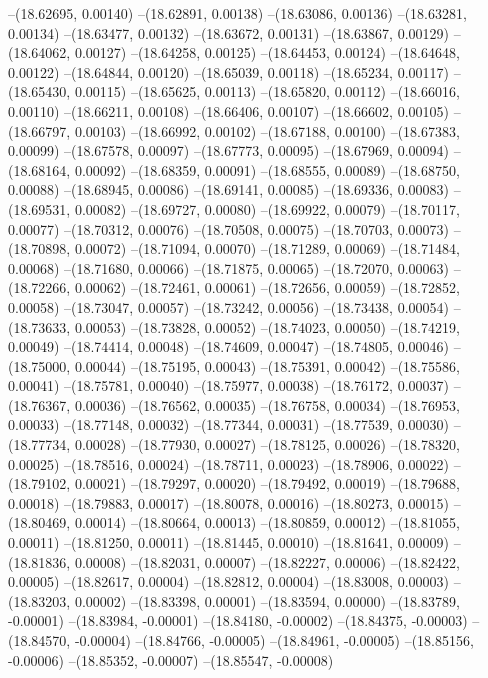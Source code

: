 --(18.62695, 0.00140)
--(18.62891, 0.00138)
--(18.63086, 0.00136)
--(18.63281, 0.00134)
--(18.63477, 0.00132)
--(18.63672, 0.00131)
--(18.63867, 0.00129)
--(18.64062, 0.00127)
--(18.64258, 0.00125)
--(18.64453, 0.00124)
--(18.64648, 0.00122)
--(18.64844, 0.00120)
--(18.65039, 0.00118)
--(18.65234, 0.00117)
--(18.65430, 0.00115)
--(18.65625, 0.00113)
--(18.65820, 0.00112)
--(18.66016, 0.00110)
--(18.66211, 0.00108)
--(18.66406, 0.00107)
--(18.66602, 0.00105)
--(18.66797, 0.00103)
--(18.66992, 0.00102)
--(18.67188, 0.00100)
--(18.67383, 0.00099)
--(18.67578, 0.00097)
--(18.67773, 0.00095)
--(18.67969, 0.00094)
--(18.68164, 0.00092)
--(18.68359, 0.00091)
--(18.68555, 0.00089)
--(18.68750, 0.00088)
--(18.68945, 0.00086)
--(18.69141, 0.00085)
--(18.69336, 0.00083)
--(18.69531, 0.00082)
--(18.69727, 0.00080)
--(18.69922, 0.00079)
--(18.70117, 0.00077)
--(18.70312, 0.00076)
--(18.70508, 0.00075)
--(18.70703, 0.00073)
--(18.70898, 0.00072)
--(18.71094, 0.00070)
--(18.71289, 0.00069)
--(18.71484, 0.00068)
--(18.71680, 0.00066)
--(18.71875, 0.00065)
--(18.72070, 0.00063)
--(18.72266, 0.00062)
--(18.72461, 0.00061)
--(18.72656, 0.00059)
--(18.72852, 0.00058)
--(18.73047, 0.00057)
--(18.73242, 0.00056)
--(18.73438, 0.00054)
--(18.73633, 0.00053)
--(18.73828, 0.00052)
--(18.74023, 0.00050)
--(18.74219, 0.00049)
--(18.74414, 0.00048)
--(18.74609, 0.00047)
--(18.74805, 0.00046)
--(18.75000, 0.00044)
--(18.75195, 0.00043)
--(18.75391, 0.00042)
--(18.75586, 0.00041)
--(18.75781, 0.00040)
--(18.75977, 0.00038)
--(18.76172, 0.00037)
--(18.76367, 0.00036)
--(18.76562, 0.00035)
--(18.76758, 0.00034)
--(18.76953, 0.00033)
--(18.77148, 0.00032)
--(18.77344, 0.00031)
--(18.77539, 0.00030)
--(18.77734, 0.00028)
--(18.77930, 0.00027)
--(18.78125, 0.00026)
--(18.78320, 0.00025)
--(18.78516, 0.00024)
--(18.78711, 0.00023)
--(18.78906, 0.00022)
--(18.79102, 0.00021)
--(18.79297, 0.00020)
--(18.79492, 0.00019)
--(18.79688, 0.00018)
--(18.79883, 0.00017)
--(18.80078, 0.00016)
--(18.80273, 0.00015)
--(18.80469, 0.00014)
--(18.80664, 0.00013)
--(18.80859, 0.00012)
--(18.81055, 0.00011)
--(18.81250, 0.00011)
--(18.81445, 0.00010)
--(18.81641, 0.00009)
--(18.81836, 0.00008)
--(18.82031, 0.00007)
--(18.82227, 0.00006)
--(18.82422, 0.00005)
--(18.82617, 0.00004)
--(18.82812, 0.00004)
--(18.83008, 0.00003)
--(18.83203, 0.00002)
--(18.83398, 0.00001)
--(18.83594, 0.00000)
--(18.83789, -0.00001)
--(18.83984, -0.00001)
--(18.84180, -0.00002)
--(18.84375, -0.00003)
--(18.84570, -0.00004)
--(18.84766, -0.00005)
--(18.84961, -0.00005)
--(18.85156, -0.00006)
--(18.85352, -0.00007)
--(18.85547, -0.00008)
